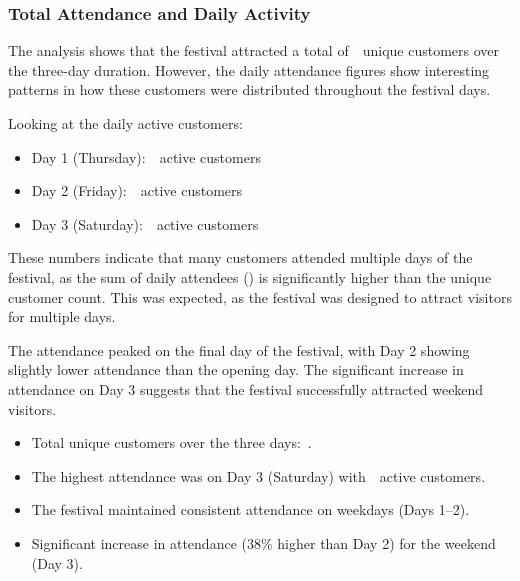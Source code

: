 
\subsubsection{Total Attendance and Daily Activity}
\label{subsubsec:analysis-total-attendance}


The analysis shows that the festival attracted a total of~~unique customers over the three-day duration.
However, the daily attendance figures show interesting patterns in how these customers were distributed throughout the festival days.

Looking at the daily active customers:
\begin{itemize}
	\item Day 1 (Thursday):~~active customers
	\item Day 2 (Friday):~~active customers
	\item Day 3 (Saturday):~~active customers
\end{itemize}

These numbers indicate that many customers attended multiple days of the festival, as the sum of daily attendees () is significantly higher than the unique customer count.
This was expected, as the festival was designed to attract visitors for multiple days.

The attendance peaked on the final day of the festival, with Day 2 showing slightly lower attendance than the opening day.
The significant increase in attendance on Day 3 suggests that the festival successfully attracted weekend visitors.

\begin{keytakeaways}
	\begin{itemize}
		\item Total unique customers over the three days:~.
		\item The highest attendance was on Day 3 (Saturday) with~~active customers.
		\item The festival maintained consistent attendance on weekdays (Days 1–2).
		\item Significant increase in attendance (38\% higher than Day 2) for the weekend (Day 3).
	\end{itemize}
\end{keytakeaways}

